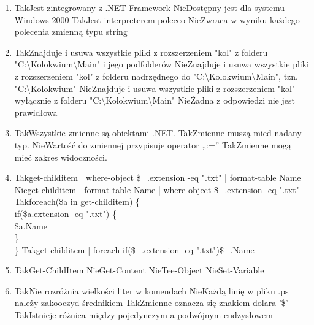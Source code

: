 \begin{enumerate}
		\newpage
		\item {}%
		{Tak}{Jest zintegrowany z .NET Framework}%
		{Nie}{Dostępny jest dla systemu Windows 2000}%
		{Tak}{Jest interpreterem poleceo}%
		{Nie}{Zwraca w wyniku każdego polecenia zmienną typu string}
		\item {}%
		{Tak}{Znajduje i usuwa wszystkie pliki z rozszerzeniem "kol" z folderu "C:\textbackslash Kolokwium\textbackslash Main" i jego podfolderów}%
		{Nie}{Znajduje i usuwa wszystkie pliki z rozszerzeniem "kol" z folderu nadrzędnego do "C:\textbackslash Kolokwium\textbackslash Main", tzn. "C:\textbackslash Kolokwium"}%
		{Nie}{Znajduje i usuwa wszystkie pliki z rozszerzeniem "kol" wyłącznie z folderu "C:\textbackslash Kolokwium\textbackslash Main"}%
		{Nie}{Żadna z odpowiedzi nie jest prawidłowa}
		\item {}%
		{Tak}{Wszystkie zmienne są obiektami .NET.}%
		{Tak}{Zmienne muszą mied nadany typ.}%
		{Nie}{Wartość do zmiennej przypisuje operator „:=”}%
		{Tak}{Zmienne mogą mieć zakres widoczności.}
		\item {}%
		{Tak}{get-childitem | where-object {\$\_.extension -eq ".txt"} | format-table Name}%
		{Nie}{get-childitem | format-table Name | where-object {\$\_.extension -eq ".txt"}}%
		{Tak}{foreach(\$a in get-childitem) \{\\
				if(\$a.extension -eq ".txt") \{\\
					\$a.Name\\
				\}\\
			\}}%
		{Tak}{get-childitem | foreach {if(\$\_.extension -eq ".txt"){\$\_.Name}}}
		\item {}%
		{Tak}{Get-ChildItem}%
		{Nie}{Get-Content}%
		{Nie}{Tee-Object}%
		{Nie}{Set-Variable}
		\item {}%
		{Tak}{Nie rozróżnia wielkości liter w komendach}%
		{Nie}{Każdą linię w pliku .ps należy zakooczyd średnikiem}%
		{Tak}{Zmienne oznacza się znakiem dolara '\$'}%
		{Tak}{Istnieje różnica między pojedynczym a podwójnym cudzysłowem}
		

\end{enumerate}
